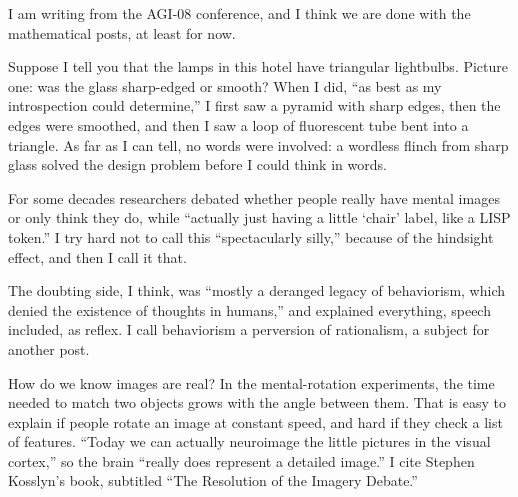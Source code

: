 
I am writing from the AGI-08 conference, and I think we are done with the mathematical posts, at least for now.

Suppose I tell you that the lamps in this hotel have triangular lightbulbs. Picture one: was the glass sharp-edged or smooth? When I did, ``as best as my introspection could determine,'' I first saw a pyramid with sharp edges, then the edges were smoothed, and then I saw a loop of fluorescent tube bent into a triangle. As far as I can tell, no words were involved: a wordless flinch from sharp glass solved the design problem before I could think in words.

For some decades researchers debated whether people really have mental images or only think they do, while ``actually just having a little `chair' label, like a LISP token.'' I try hard not to call this ``spectacularly silly,'' because of the hindsight effect, and then I call it that. 

The doubting side, I think, was ``mostly a deranged legacy of behaviorism, which denied the existence of thoughts in humans,'' and explained everything, speech included, as reflex. I call behaviorism a perversion of rationalism, a subject for another post. 

How do we know images are real? In the mental-rotation experiments, the time needed to match two objects grows with the angle between them. That is easy to explain if people rotate an image at constant speed, and hard if they check a list of features. ``Today we can actually neuroimage the little pictures in the visual cortex,'' so the brain ``really does represent a detailed image.'' I cite Stephen Kosslyn's book, subtitled ``The Resolution of the Imagery Debate.'' 

